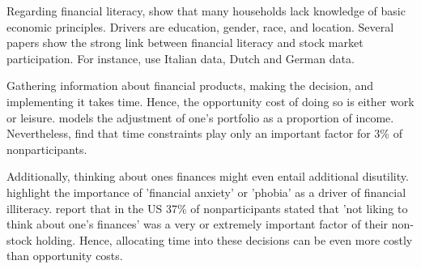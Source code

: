 \documentclass[ProjectABM]{subfiles}
\begin{document}
Regarding financial literacy, \cite{lusardi_mitchell_2011financial_literacy} show that many households lack knowledge of basic economic principles. Drivers are education, gender, race, and location. %
Several papers show the strong link between financial literacy and stock market participation. For instance, \cite{guiso_japelli_2002household_book} use Italian data, \cite{hochguertel_et_al_2002household,vanrooij_et_al_2011} Dutch and \cite{borsch_eymann_2000household} German data.

Gathering information about financial products, making the decision, and implementing it takes time. Hence, the opportunity cost of doing so is either work or leisure. \cite{bonaparte_et_al_2012adjustment} models the adjustment of one's portfolio as a proportion of income. Nevertheless, \cite{choi_2020} find that time constraints play only an important factor for 3\% of nonparticipants. %

Additionally, thinking about ones finances might even entail additional disutility. \cite{shapiro_burchell_2012} highlight the importance of 'financial anxiety' or 'phobia' as a driver of financial illiteracy. \cite{choi_2020} report that in the US 37\% of nonparticipants stated that 'not liking to think about one's finances' was a very or extremely important factor of their non-stock holding. Hence, allocating time into these decisions can be even more costly than opportunity costs.
\end{document}

